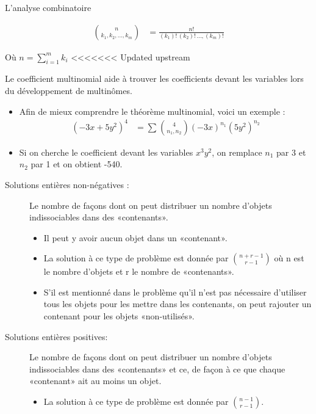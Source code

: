 \documentclass[10pt, french]{article}
\begin{document}
\begin{multicols*}{3}
\begin{probch1}{L'analyse combinatoire}
\begin{description}
\begin{align*}
  \binom{n}{k_1, k_2, ..., k_m}
  &= \frac{n!}{(k_1)! \, (k_2)! \, ..., (k_m)!}
  \end{align*}
  \item[] Où {$n = \sum_{i = 1}^{m} k_i$}
<<<<<<< Updated upstream
  \item[Théorème multinomial :] Le coefficient multinomial aide à trouver les coefficients devant les variables lors du développement de multinômes. 
  \begin{itemize}
	  \item Afin de mieux comprendre le théorème multinomial, voici un exemple :
	  	\setlength{\mathindent}{-1cm}
		  \begin{align*}
			(-3x+5y^2)^4 
			&=	\sum_{}^{} \binom{4}{n_1 , n_2} (-3x)^{n_1} (5y^{2})^{n_2}
		  \end{align*}
		\setlength{\mathindent}{1cm}
	 \item Si on cherche le coefficient devant les variables $x^{3}y^{2}$, on remplace $n_1$ par 3 et $n_2$ par 1 et on obtient -540.
\end{itemize} 
\end{description}  
\begin{description}
  \item[Solutions entières non-négatives :] Le nombre de façons dont on peut distribuer un nombre d'objets indissociables dans des «contenants». 
	\begin{itemize}
		\item Il peut y avoir aucun objet dans un «contenant». 
		\item La solution à ce type de problème est donnée par $\binom{n+r-1}{r-1}$ où n est le nombre d'objets et r le nombre de «contenants». 
		\item S'il est mentionné dans le problème qu'il n'est pas nécessaire d'utiliser tous les objets pour les mettre dans les contenants, on peut rajouter un contenant pour les objets «non-utilisés».
	\end{itemize}
  \item[Solutions entières positives:] Le nombre de façons dont on peut distribuer un nombre d'objets indissociables dans des «contenants» et ce, de façon à ce que chaque «contenant» ait au moins un objet. 
  \begin{itemize}
	  \item La solution à ce type de problème est donnée par $\binom{n-1}{r-1}$.
  \end{itemize} 
\end{description}
\end{probch1}


\end{multicols*}
\end{document}
